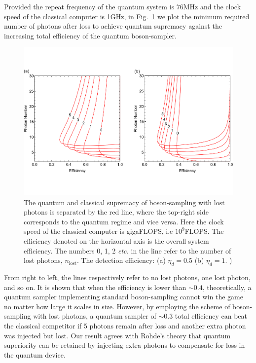 \documentclass[aps,rmp,twocolumn,amsmath,amssymb,nofootinbib,superscriptaddress]{revtex4}
\newcommand{\comment}[1]{{\color{blue}{#1}}}
\begin{document}
Provided the repeat frequency of the quantum system is 76MHz and the clock speed of the classical computer is 1GHz, in Fig.~\ref{fig:curve_hybrid} we plot the minimum required number of photons after loss to achieve quantum supremacy against the increasing total efficiency of the quantum boson-sampler.

\begin{figure}[!htb]
\includegraphics[width=\columnwidth]{curves_loss}
\caption{The quantum and classical supremacy of boson-sampling with lost photons is separated by the red line, where the top-right side corresponds to the quantum regime and vice versa. Here the clock speed of the classical computer is gigaFLOPS, i.e $10^9$FLOPS. The efficiency denoted on the horizontal axis is the overall system efficiency. The numbers 0, 1, 2 \emph{etc.} in the line refer to the number of lost photons, $n_\mathrm{lost}$. The detection efficiency: (a) \mbox{$\eta_d=0.5$} (b) \mbox{$\eta_d=1$}. \comment{(Why does the curve have the change in direction?})} \label{fig:curve_hybrid}
\end{figure}

From right to left, the lines respectively refer to no lost photons, one lost photon, and so on. It is shown that when the efficiency is lower than $\sim 0.4$, theoretically, a quantum sampler implementing standard boson-sampling cannot win the game no matter how large it scales in size. However, by employing the scheme of boson-sampling with lost photons, a quantum sampler of $\sim 0.3$ total efficiency can beat the classical competitor if 5 photons remain after loss and another extra photon was injected but lost. Our result agrees with Rohde's theory \cite{bib:22} that quantum superiority can be retained by injecting extra photons to compensate for loss in the quantum device.
\end{document}
